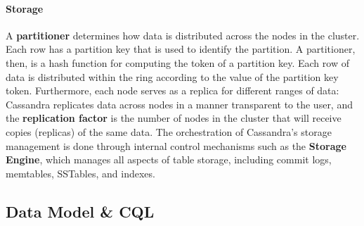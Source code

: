 \paragraph{Storage} A \textbf{partitioner} determines how data is distributed across the nodes in the cluster. Each row has a partition key that is used to identify the partition. A partitioner, then, is a hash function for computing the token of a partition key. Each row of data is distributed within the ring according to the value of the partition key token. Furthermore, each node serves as a replica for different ranges of data: Cassandra replicates data across nodes in a manner transparent to the user, and the \textbf{replication factor} is the number of nodes in the cluster that will receive copies (replicas) of the same data.
The orchestration of Cassandra's storage management is done through internal control mechanisms such as the \textbf{Storage Engine}, which manages all aspects of table storage, including commit logs, memtables, SSTables, and indexes.

\subsection{Data Model \& CQL}


